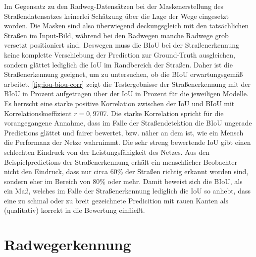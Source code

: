 Im Gegensatz zu den Radweg-Datensätzen bei der Maskenerstellung des Straßendatensatzes keinerlei Schätzung 
über die Lage der Wege eingesetzt worden. Die Masken sind also überwiegend deckungsgleich mit den tatsächlichen 
Straßen im Input-Bild, während bei den Radwegen manche Radwege grob versetzt positioniert sind. 
Deswegen muss die BIoU bei der Straßenerkennung keine komplette Verschiebung der Prediction zur Ground-Truth ausgleichen, 
sondern glättet lediglich die IoU im Randbereich der Straßen. Daher ist die Straßenerkennung geeignet, 
um zu untersuchen, ob die BIoU erwartungsgemäß arbeitet. \autoref{fig:iou-biou-corr} zeigt die Testergebnisse der 
Straßenerkennung mit der BIoU in Prozent aufgetragen über der IoU in Prozent für die jeweiligen Modelle. 
Es herrscht eine starke positive Korrelation zwischen der IoU und BIoU mit Korrelationskoeffizient $r = 0,9707$. 
Die starke Korrelation spricht für die vorangegangene Annahme, dass im Falle der Straßendetektion die BIoU 
ungerade Predictions glättet und fairer bewertet, bzw. näher an dem ist, wie ein Mensch die Performanz der 
Netze wahrnimmt. Die sehr streng bewertende IoU gibt einen schlechten Eindruck von der Leistungsfähigkeit des Netzes. 
Aus den Beispielpredictions der Straßenerkennung erhält ein menschlicher Beobachter nicht den Eindruck, 
dass nur circa 60\% der Straßen richtig erkannt worden sind, sondern eher im Bereich von 80\% oder mehr. 
Damit beweist sich die BIoU, als ein Maß, welches im Falle der Straßenerkennung lediglich die IoU so anhebt, 
dass eine zu schmal oder zu breit gezeichnete Predicition mit rauen Kanten als (qualitativ) korrekt in 
die Bewertung einfließt.  

\section{Radwegerkennung}


